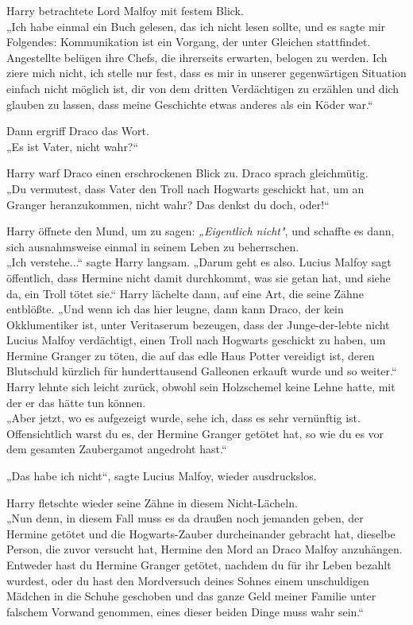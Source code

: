 {Harry betrachtete Lord Malfoy mit festem Blick.\\ „Ich habe einmal ein Buch gelesen, das ich nicht lesen sollte, und es sagte mir Folgendes: Kommunikation ist ein Vorgang, der unter Gleichen stattfindet. Angestellte belügen ihre Chefs, die ihrerseits erwarten, belogen zu werden. Ich ziere mich nicht, ich stelle nur fest, dass es mir in unserer gegenwärtigen Situation einfach nicht möglich ist, dir von dem dritten Verdächtigen zu erzählen und dich glauben zu lassen, dass meine Geschichte etwas anderes als ein Köder war.“

Dann ergriff Draco das Wort.\\ „Es ist Vater, nicht wahr?“

Harry warf Draco einen erschrockenen Blick zu. Draco sprach gleichmütig.\\ „Du vermutest, dass Vater den Troll nach Hogwarts geschickt hat, um an Granger heranzukommen, nicht wahr? Das denkst du doch, oder!“

Harry öffnete den Mund, um zu sagen: \emph{„Eigentlich nicht"}, und schaffte es dann, sich ausnahmsweise einmal in seinem Leben zu beherrschen.\\ „Ich verstehe...“ sagte Harry langsam. „Darum geht es also. Lucius Malfoy sagt öffentlich, dass Hermine nicht damit durchkommt, was sie getan hat, und siehe da, ein Troll tötet sie.“ Harry lächelte dann, auf eine Art, die seine Zähne entblößte. „Und wenn ich das hier leugne, dann kann Draco, der kein Okklumentiker ist, unter Veritaserum bezeugen, dass der Junge-der-lebte nicht Lucius Malfoy verdächtigt, einen Troll nach Hogwarts geschickt zu haben, um Hermine Granger zu töten, die auf das edle Haus Potter vereidigt ist, deren Blutschuld kürzlich für hunderttausend Galleonen erkauft wurde und so weiter.“\\ Harry lehnte sich leicht zurück, obwohl sein Holzschemel keine Lehne hatte, mit der er das hätte tun können.\\ „Aber jetzt, wo es aufgezeigt wurde, sehe ich, dass es sehr vernünftig ist. Offensichtlich warst du es, der Hermine Granger getötet hat, so wie du es vor dem gesamten Zaubergamot angedroht hast.“

„Das habe ich nicht“, sagte Lucius Malfoy, wieder ausdruckslos.

Harry fletschte wieder seine Zähne in diesem Nicht-Lächeln.\\ „Nun denn, in diesem Fall muss es da draußen noch jemanden geben, der Hermine getötet und die Hogwarts-Zauber durcheinander gebracht hat, dieselbe Person, die zuvor versucht hat, Hermine den Mord an Draco Malfoy anzuhängen. Entweder hast du Hermine Granger getötet, nachdem du für ihr Leben bezahlt wurdest, oder du hast den Mordversuch deines Sohnes einem unschuldigen Mädchen in die Schuhe geschoben und das ganze Geld meiner Familie unter falschem Vorwand genommen, eines dieser beiden Dinge muss wahr sein.“

}
